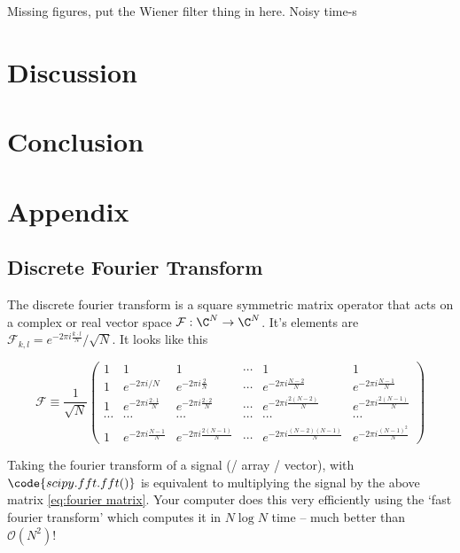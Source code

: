 \documentclass[12pt]{article}
\begin{document}
Missing figures, put the Wiener filter thing in here. Noisy time-s


\section{Discussion}\label{sec:discussion} 


\section{Conclusion}\label{sec:conclusion} 


\section{Appendix}

\subsection{Discrete Fourier Transform}
The discrete fourier transform is a square symmetric matrix operator that acts on a complex or real vector space $\mathcal F : \C^N \to \C^N$. It's elements are $\mathcal F_{k,l} = e^{-2\pi i\frac{k\cdot l}{N}}/\sqrt N$. It looks like this

\begin{equation}\label{eq:fourier matrix}
\mathcal F \equiv \frac{1}{\sqrt N}
\begin{pmatrix}
    1 & 1 & 1 & \cdots & 1 & 1\\
    1 & e^{-2\pi i / N} & e^{-2\pi i \frac{2}{N}} & \cdots & e^{-2\pi i \frac{N-2}{N}} & e^{-2\pi i \frac{N-1}{N}}\\
    1 & e^{-2\pi i\frac{2\cdot 1}{N}} & e^{-2\pi i\frac{2\cdot 2}{N}} & \cdots & e^{-2\pi i \frac{2(N-2)}{N}} & e^{-2\pi i \frac{2(N-1)}{N}}\\
    \cdots & \cdots & \cdots & \cdots & \cdots & \cdots\\
    1 & e^{-2\pi i \frac{N-1}{N}} & e^{-2\pi i \frac{2(N-1)}{N}} & \cdots & e^{-2\pi i \frac{(N-2)(N-1)}{N}} & e^{-2\pi i \frac{(N-1)^2}{N}}
\end{pmatrix}
\end{equation}

Taking the fourier transform of a signal (/ array / vector), with $\code{scipy.fft.fft()}$ is equivalent to multiplying the signal by the above matrix \eqref{eq:fourier matrix}. Your computer does this very efficiently using the `fast fourier transform' which computes it in $N\log N$ time -- much better than $\mathcal O(N^2)$!\\
\end{document}
